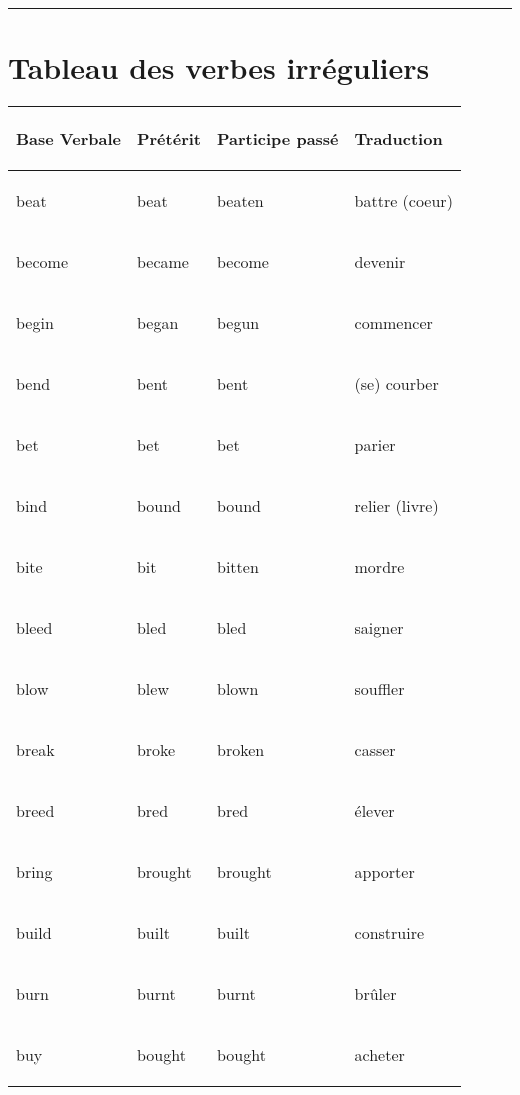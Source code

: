 \documentclass[
]{article}
\begin{document}
\begin{center}\rule{0.5\linewidth}{0.5pt}\end{center}

\hypertarget{tableau-des-verbes-irruxe9guliers}{%
\section{Tableau des verbes irréguliers}\label{tableau-des-verbes-irruxe9guliers}}

\begin{longtable}{>{\bfseries\raggedright\arraybackslash}p{3cm}ll>{\bfseries\raggedright\arraybackslash}p{3cm}}
\toprule
Base Verbale & Prétérit & Participe passé & Traduction\\
\midrule
\rowcolor{gray!6}  beat & beat & beaten & battre (coeur)\\

become & became & become & devenir\\

\rowcolor{gray!6}  begin & began & begun & commencer\\

bend & bent & bent & (se) courber\\

\rowcolor{gray!6}  bet & bet & bet & parier\\

bind & bound & bound & relier (livre)\\

\rowcolor{gray!6}  bite & bit & bitten & mordre\\

bleed & bled & bled & saigner\\

\rowcolor{gray!6}  blow & blew & blown & souffler\\

break & broke & broken & casser\\

\rowcolor{gray!6}  breed & bred & bred & élever\\

bring & brought & brought & apporter\\

\rowcolor{gray!6}  build & built & built & construire\\

burn & burnt & burnt & brûler\\

\rowcolor{gray!6}  buy & bought & bought & acheter\\


\end{longtable}
\end{document}
